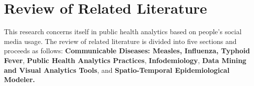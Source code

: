 \chapter{Review of Related Literature}

This research concerns itself in public health analytics based on people's social media usage. The review of related literature is divided into five sections and proceeds as follows: \textbf{Communicable Diseases: Measles, Influenza, Typhoid Fever}, \textbf{Public Health Analytics Practices}, \textbf{Infodemiology},  \textbf{Data Mining and Visual Analytics Tools}, and \textbf{Spatio-Temporal Epidemiological Modeler.} 



















